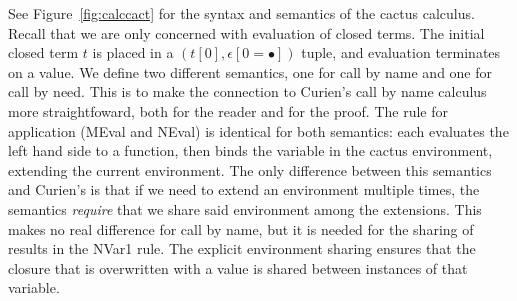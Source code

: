 See Figure~\ref{fig:calccact} for the syntax and semantics of the cactus
calculus. Recall that we are only concerned with evaluation of closed terms. The
initial closed term $t$ is placed in a $(t[0],\epsilon[0=\bullet])$ tuple, and
evaluation terminates on a value. We define two different semantics, one for
call by name and one for call by need. This is to make the connection to
Curien's call by name calculus more straightfoward, both for the reader and
for the proof. The rule for application (MEval and NEval) is identical for
both semantics: each evaluates the left hand side to a function, then binds
the variable in the cactus environment, extending the current environment.
The only difference between this semantics and Curien's is that if we need
to extend an environment multiple times, the semantics \emph{require}
that we share said environment among the extensions. This makes no real
difference for call by name, but it is needed for the sharing of results in the
NVar1 rule. The explicit environment sharing ensures that the closure that is
overwritten with a value is shared between instances of that variable. 

